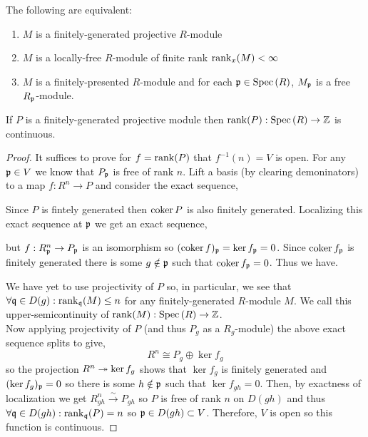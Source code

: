\documentclass[12pt]{article}
\begin{document}
\begin{theorem}
The following are equivalent:
\begin{enumerate}
\item $M$ is a finitely-generated projective $R$-module
\item $M$ is a locally-free $R$-module of finite rank $\mathrm{rank}_x(M) < \infty$
\item $M$ is a finitely-presented $R$-module and for each $\mathfrak{p} \in \mathrm{Spec}\left( R \right)$, $M_{\mathfrak{p}}$ is a free $R_{\mathfrak{p}}$-module. 
\end{enumerate}
\end{theorem}

\begin{proposition}
If $P$ is a finitely-generated projective module then $\mathrm{rank}(P) : \mathrm{Spec}\left( R \right) \to \mathbb{Z}$ is continuous.
\end{proposition}

\begin{proof}
It suffices to prove for $f = \mathrm{rank}(P)$ that $f^{-1}(n) = V$ is open. For any $\mathfrak{p} \in V$ we know that $P_{\mathfrak{p}}$ is free of rank $n$. Lift a basis (by clearing demoninators) to a map $f : R^n \to P$ and consider the exact sequence,
\begin{center}
\end{center}  
Since $P$ is fintely generated then $\operatorname{\mathrm{coker}}{P}$ is also finitely generated. Localizing this exact sequence at $\mathfrak{p}$ we get an exact sequence,
\begin{center}
\end{center}
but $f : R^n_{\mathfrak{p}} \to P_{\mathfrak{p}}$ is an isomorphism so $(\operatorname{\mathrm{coker}}{f})_{\mathfrak{p}} = \ker{f}_{\mathfrak{p}} = 0$. Since $\operatorname{\mathrm{coker}}{f}_{\mathfrak{p}}$ is finitely generated there is some $g \notin \mathfrak{p}$ such that $\operatorname{\mathrm{coker}}{f}_{\mathfrak{p}} = 0$. Thus we have.
\begin{center}
\end{center}
We have yet to use projectivity of $P$ so,
in particular, we see that $\forall \mathfrak{q} \in D(g) : \mathrm{rank}_{\mathfrak{q}}(M) \le n$ for any finitely-generated $R$-module $M$. We call this upper-semicontinuity of $\mathrm{rank}(M) : \mathrm{Spec}\left( R \right) \to \mathbb{Z}$.
\bigskip\\
Now applying projectivity of $P$ (and thus $P_g$ as a $R_g$-module) the above exact sequence splits to give,
\[ R^n \cong P_g \oplus \ker{f}_g \]
so the projection $R^n \twoheadrightarrow \ker{f}_g$ shows that $\ker{f}_g$ is finitely generated and $(\ker{f}_g)_{\mathfrak{p}} = 0$ so there is some $h \notin \mathfrak{p}$ such that $\ker{f}_{gh} = 0$. Then, by exactness of localization we get $R_{gh}^n \xrightarrow{\sim} P_{gh}$ so $P$ is free of rank $n$ on $D(gh)$ and thus $\forall \mathfrak{q} \in D(gh) : \mathrm{rank}_{\mathfrak{q}}(P) = n$ so $\mathfrak{p} \in D(gh) \subset V$. Therefore, $V$ is open so this function is continuous.  
\end{proof}
\end{document}
